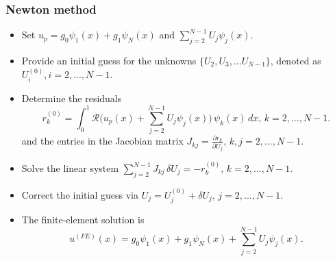 \documentclass{beamer}
\newcommand{\bi}{\begin{itemize}}
\newcommand{\ei}{\end{itemize}}
\begin{document}



\begin{frame}
	\frametitle{Newton method}
	\begin{overlayarea}{\textwidth}{\textheight}
		\vspace{-0.5cm}\small	
		\bi
		\item Set $u_p=g_0\psi_1(x)+g_1\psi_N(x)$ and $\sum^{N-1}_{j=2}U_j\psi_j(x)$.
		\item Provide an initial guess for the unknowns $\{U_2,U_3,...U_{N-1}\}$, denoted as $U_i^{(0)}, i=2,...,N-1.$
		\item Determine the residuals $$r_k^{(0)}=\int^1_0\mathcal{R}\Bigg(u_p(x)+\sum^{N-1}_{j=2}U_j\psi_j(x)\Bigg)\,\psi_k(x)\,dx,\, k=2,...,N-1.$$
	 and the entries in the Jacobian matrix $J_{kj}=\frac{\partial r_k}{\partial U_j},\, k,j=2,...,N-1.$
	 \item Solve the linear system $\sum^{N-1}_{j=2}J_{kj}\,\delta U_j=-r_k^{(0)},\,k=2,...,N-1.$
	 \item Correct the initial guess via $U_j=U_j^{(0)}+\delta U_j,\, j=2,...,N-1.$ 
	 \item The finite-element solution is\vspace{-0.2cm} $$u^{(FE)}(x)=g_0\psi_1(x)+g_1\psi_N(x)+\sum^{N-1}_{j=2}U_j\psi_j(x).$$
		\ei
	\end{overlayarea}
\end{frame}

\end{document}
